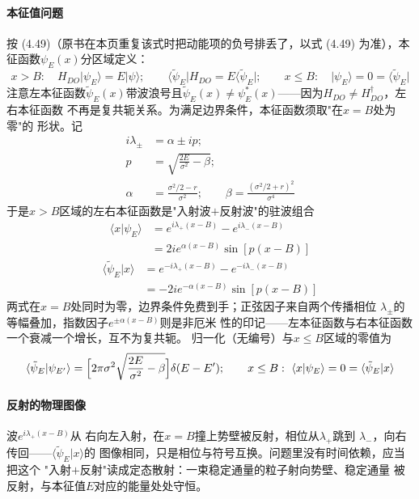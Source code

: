 \paragraph{本征值问题}
按 (4.49)（原书在本页重复该式时把动能项的负号排丢了，以式 (4.49)
为准），本征函数$\psi_E(x)$分区域定义：
\begin{equation*}
x>B:\quad H_{DO}\vert\psi_E\rangle=E\vert\psi\rangle;\qquad
\langle\tilde{\psi}_E\vert H_{DO}=E\langle\tilde{\psi}_E\vert;
\qquad x\leq B:\quad \vert\psi_E\rangle=0=\langle\tilde{\psi}_E\vert
\end{equation*}
注意左本征函数$\tilde{\psi}_E(x)$带波浪号且$\tilde{\psi}_E(x)\neq
\psi_E^{*}(x)$——因为$H_{DO}\neq H_{DO}^{\dagger}$，左右本征函数
不再是复共轭关系。为满足边界条件，本征函数须取"在$x=B$处为零"的
形状。记
\begin{align*}
i\lambda_{\pm}&=\alpha\pm ip;\\
p&=\sqrt{\frac{2E}{\sigma^{2}}-\beta};\\
\alpha&=\frac{\sigma^{2}/2-r}{\sigma^{2}};\qquad
\beta=\frac{(\sigma^{2}/2+r)^{2}}{\sigma^{4}}
\end{align*}
于是$x>B$区域的左右本征函数是"入射波$+$反射波"的驻波组合
\begin{align*}
\langle x\vert\psi_E\rangle&=e^{i\lambda_{+}(x-B)}-e^{i\lambda_{-}(x-B)}\\
&=2ie^{\alpha(x-B)}\sin[p(x-B)]
\tag{4.61}
\end{align*}
\begin{align*}
\langle\tilde{\psi}_E\vert x\rangle&=e^{-i\lambda_{+}(x-B)}
-e^{-i\lambda_{-}(x-B)}\\
&=-2ie^{-\alpha(x-B)}\sin[p(x-B)]
\tag{4.62}
\end{align*}
两式在$x=B$处同时为零，边界条件免费到手；正弦因子来自两个传播相位
$\lambda_{\pm}$的等幅叠加，指数因子$e^{\pm\alpha(x-B)}$则是非厄米
性的印记——左本征函数与右本征函数一个衰减一个增长，互不为复共轭。
归一化（无编号）与$x\leq B$区域的零值为
\begin{equation*}
\langle\tilde{\psi}_E\vert\psi_{E'}\rangle=\Bigl[2\pi\sigma^{2}
\sqrt{\frac{2E}{\sigma^{2}}-\beta}\Bigr]\delta(E-E');\qquad
x\leq B:\ \langle x\vert\psi_E\rangle=0=\langle\tilde{\psi}_E\vert x\rangle
\end{equation*}

\paragraph{反射的物理图像}
波$e^{i\lambda_{+}(x-B)}$从
右向左入射，在$x=B$撞上势壁被反射，相位从$\lambda_{+}$跳到
$\lambda_{-}$，向右传回——$\langle\tilde{\psi}_E\vert x\rangle$的
图像相同，只是相位与符号互换。问题里没有时间依赖，应当把这个
"入射$+$反射"读成定态散射：一束稳定通量的粒子射向势壁、稳定通量
被反射，与本征值$E$对应的能量处处守恒。

